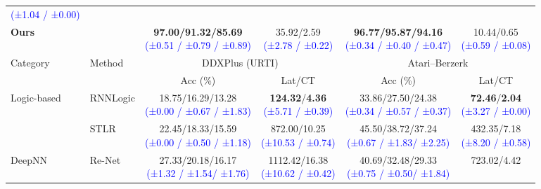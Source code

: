\documentclass{article} %
\newcommand{\revise}[1]{\textcolor{blue}{#1}}
\begin{document}
\begin{table}[H]
\begin{tabular}{l l c c c c}
{\revise{{\footnotesize (±1.04 / ±0.00)}}} \\
\textbf{Ours} & &
\makecell[c]{\textbf{97.00/91.32/85.69}\\[-1pt]
\revise{{\footnotesize (±0.51 / ±0.79 / ±0.89)}}}
&
\makecell[c]{35.92/2.59\\[-1pt]
\revise{{\footnotesize (±2.78 / ±0.22)}}}
&
\makecell[c]{\textbf{96.77/95.87/94.16}\\[-1pt]
\revise{{\footnotesize (±0.34 / ±0.40 / ±0.47)}}}
&
\makecell[c]{10.44/0.65\\[-1pt]
\revise{{\footnotesize (±0.59 / ±0.08)}}}
\\
\midrule
\multirow{2}{*}{Category} & \multirow{2}{*}{Method}
& \multicolumn{2}{c}{DDXPlus (URTI)} & \multicolumn{2}{c}{Atari--Berzerk} \\
\cmidrule(lr){3-4} \cmidrule(lr){5-6}
& & Acc (\%) & Lat/CT & Acc (\%) & Lat/CT \\
\midrule
\multirow{2}{*}{Logic-based}
& RNNLogic & \makecell[c]{18.75/16.29/13.28\\[-1pt]
\revise{{\footnotesize (±0.00 / ±0.67 / ±1.83)}}} & \makecell[c]{\textbf{124.32}/\textbf{4.36}\\[-1pt]
\revise{{\footnotesize (±5.71 / ±0.39)}}} & \makecell[c]{33.86/27.50/24.38\\[-1pt]
\revise{{\footnotesize (±0.34 / ±0.57 / ±0.37)}}} & \makecell[c]{\textbf{72.46}/\textbf{2.04}\\[-1pt]
\revise{{\footnotesize (±3.27 / ±0.00)}}} \\
& STLR     & \makecell[c]{22.45/18.33/15.59\\[-1pt]
\revise{{\footnotesize (±0.00 / ±0.50 / ±1.18)}}} & \makecell[c]{872.00/10.25\\[-1pt]
\revise{{\footnotesize (±10.53 / ±0.74)}}} & \makecell[c]{45.50/38.72/37.24\\[-1pt]
\revise{{\footnotesize (±0.67 / ±1.83/ ±2.25)}}} & \makecell[c]{432.35/7.18\\[-1pt]
\revise{{\footnotesize (±8.20 / ±0.58)}}} \\
DeepNN & Re-Net & \makecell[c]{27.33/20.18/16.17\\[-1pt]
\revise{{\footnotesize (±1.32 / ±1.54/ ±1.76)}}} & \makecell[c]{1112.42/16.38\\[-1pt]
\revise{{\footnotesize (±10.62 / ±0.42)}}} & \makecell[c]{40.69/32.48/29.33\\[-1pt]
\revise{{\footnotesize (±0.75 / ±0.50/ ±1.84)}}} & \makecell[c]{723.02/4.42\\[-1pt]
}
\end{tabular}
\end{table}
\end{document}
